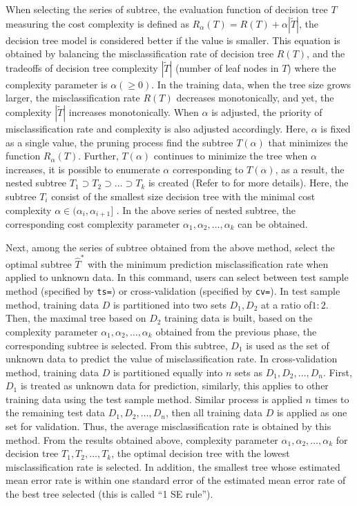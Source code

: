 When selecting the series of subtree, the evaluation function of decision tree $T$ measuring the cost complexity is defined as $R_{\alpha}(T)=R(T)+\alpha|\tilde{T}|$, the decision tree model is considered better if the value is smaller. This equation is obtained by balancing the misclassification rate of decision tree $R(T)$, and the tradeoffs of decision tree complexity $|\tilde{T}|$ (number of leaf nodes in $T$) where the complexity parameter is $\alpha(\ge 0)$. In the training data, when the tree size grows larger, the misclassification rate $R(T)$ decreases monotonically, and yet, the complexity $|\tilde{T}|$ increases monotonically. When $\alpha$ is adjusted, the priority of misclassification rate and complexity is also adjusted accordingly. Here, $\alpha$ is fixed as a single value, the pruning process find the subtree $T(\alpha)$ that minimizes the function $R_{\alpha}(T)$. Further, $T(\alpha)$ continues to minimize the tree when $\alpha$ increases, it is possible to enumerate $\alpha$ corresponding to $T(\alpha)$, as a result, the nested subtree $T_1 \supset T_2 \supset \dots \supset T_k$ is created (Refer to \cite{Breiman84} for more details).  Here, the subtree $T_i$ consist of the smallest size decision tree with the minimal cost complexity $\alpha \in (\alpha_i,\alpha_{i+1}]$ .  In the above series of nested subtree, the corresponding cost complexity parameter $\alpha_1,\alpha_2,\dots,\alpha_k$ can be obtained. 

Next, among the series of subtree obtained from the above method, select the optimal subtree $\hat{T}^*$ with the minimum prediction misclassification rate when applied to unknown data. In this command, users can select between test sample method (specified by \verb|ts=|) or cross-validation (specified by \verb|cv=|). In test sample method, training data $D$ is partitioned into two sets  $D_1,D_2$ at a ratio of$1:2$. Then, the maximal tree based on $D_2$ training data is built, based on the complexity parameter $\alpha_1,\alpha_2,\dots,\alpha_k$ obtained from the previous phase, the corresponding subtree is selected. From this subtree, $D_1$ is used as the set of unknown data to predict the value of misclassification rate.  In cross-validation method, training data $D$ is partitioned equally into $n$ sets as $D_1,D_2,\dots,D_n$. First, $D_1$ is treated as unknown data for prediction, similarly, this applies to other training data using the test sample method. Similar process is applied $n$ times to the remaining test data $D_1,D_2,\dots,D_n$, then all training data $D$ is applied as one set for validation. Thus, the average misclassification rate is obtained by this method. From the results obtained above, complexity parameter  $\alpha_1,\alpha_2,\dots,\alpha_k$ for decision tree $T_1, T_2, \dots, T_k$, the optimal decision tree with the lowest misclassification rate is selected. In addition,  the smallest tree whose estimated mean error rate is within one standard error of the estimated mean error rate of the best tree selected (this is called “1 SE rule”).

